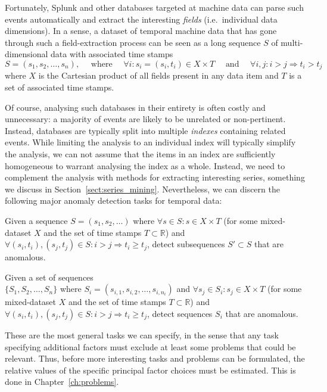 Fortunately, Splunk and other databases targeted at machine data can parse such events automatically and extract the interesting \emph{fields} (i.e.\ individual data dimensions). In a sense, a dataset of temporal machine data that has gone through such a field-extraction process can be seen as a long sequence $S$ of multi-dimensional data with associated time stamps
\[
  S = (s_1, s_2, \dots, s_n), \quad \text{ where } \quad \forall i: s_i = (s_i, t_i) \in X \times T \quad \text{ and } \quad \forall i,j: i > j \Rightarrow t_i > t_j
\]
where $X$ is the Cartesian product of all fields present in any data item and $T$ is a set of associated time stamps.

Of course, analysing such databases in their entirety is often costly and unnecessary: a majority of events are likely to be unrelated or non-pertinent. Instead, databases are typically split into multiple \emph{indexes} containing related events. While limiting the analysis to an individual index will typically simplify the analysis, we can not assume that the items in an index are sufficiently homogeneous to warrant analysing the index as a whole. Instead, we need to complement the analysis with methods for extracting interesting series, something we discuss in Section~\ref{sect:series_mining}. Nevertheless, we can discern the following major anomaly detection tasks for temporal data:

\begin{task}
\label{task:ad_splunk}
  Given a sequence $S = (s_1, s_2, \dots)$ where $\forall s \in S: s \in X \times T$ (for some mixed-dataset $X$ and the set of time stamps $T \subset \mathbb{R}$) and $\forall (s_i, t_i), (s_j, t_j) \in S: i > j \Rightarrow t_i \geq t_j$, detect subsequences $S' \subset S$ that are anomalous.
\end{task}
\begin{task}
\label{task:ad_splunk2}
  Given a set of sequences\\ $\{S_1, S_2, \dots, S_n\}$ where $S_i = (s_{i,1}, s_{i,2}, \dots, s_{i, n_i})$ and $\forall s_j \in S_i: s_j \in X \times T$ (for some mixed-dataset $X$ and the set of time stamps $T \subset \mathbb{R}$) and $\forall (s_i, t_i), (s_j, t_j) \in S: i > j \Rightarrow t_i \geq t_j$, detect sequences $S_i$ that are anomalous.
\end{task}

These are the most general tasks we can specify, in the sense that any task specifying additional factors must exclude at least some problems that could be relevant. Thus, before more interesting tasks and problems can be formulated, the relative values of the specific principal factor choices must be estimated. This is done in Chapter~\ref{ch:problems}.

